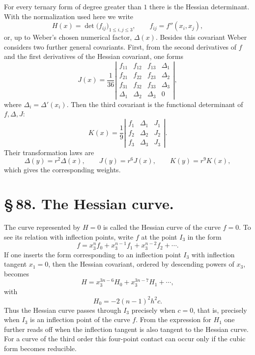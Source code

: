 \documentclass[11pt]{article}
\begin{document}
For every ternary form of degree greater than $1$ there is the Hessian determinant. With the normalization used here we write
\begin{equation}
 H(x)=\det\bigl(f_{ij}\bigr)_{1\le i,j\le3},\qquad f_{ij}=f''(x_i,x_j),
 \tag{2}
\end{equation}
or, up to Weber's chosen numerical factor, $\Delta(x)$. Besides this covariant Weber considers two further general covariants. First, from the second derivatives of $f$ and the first derivatives of the Hessian covariant, one forms
\begin{equation}
 J(x)=\frac1{36}
 \left|\begin{array}{cccc}
 f_{11}&f_{12}&f_{13}&\Delta_1\\
 f_{21}&f_{22}&f_{23}&\Delta_2\\
 f_{31}&f_{32}&f_{33}&\Delta_3\\
 \Delta_1&\Delta_2&\Delta_3&0
 \end{array}\right|,
 \tag{3}
\end{equation}
where $\Delta_i=\Delta'(x_i)$. Then the third covariant is the functional determinant of $f,\Delta,J$:
\begin{equation}
 K(x)=\frac1{9}
 \left|\begin{array}{ccc}
 f_1&\Delta_1&J_1\\
 f_2&\Delta_2&J_2\\
 f_3&\Delta_3&J_3
 \end{array}\right|.
 \tag{4}
\end{equation}
Their transformation laws are
\begin{equation}
 \Delta(y)=r^2\Delta(x),\qquad J(y)=r^6J(x),\qquad K(y)=r^9K(x),
 \tag{5}
\end{equation}
which gives the corresponding weights.

\section*{\S\,88. The Hessian curve.}

The curve represented by $H=0$ is called the Hessian curve of the curve $f=0$. To see its relation with inflection points, write $f$ at the point $I_3$ in the form
\begin{equation}
 f=x_3^n f_0+x_3^{n-1}f_1+x_3^{n-2}f_2+\cdots.
 \tag{1}
\end{equation}
If one inserts the form corresponding to an inflection point $I_3$ with inflection tangent $x_1=0$, then the Hessian covariant, ordered by descending powers of $x_3$, becomes
\begin{equation}
 H=x_3^{3n-6}H_0+x_3^{3n-7}H_1+\cdots,
 \tag{2}
\end{equation}
with
\begin{equation}
 H_0=-2(n-1)^2h^2c.
 \tag{3}
\end{equation}
Thus the Hessian curve passes through $I_3$ precisely when $c=0$, that is, precisely when $I_3$ is an inflection point of the curve $f$. From the expression for $H_1$ one further reads off when the inflection tangent is also tangent to the Hessian curve. For a curve of the third order this four-point contact can occur only if the cubic form becomes reducible.
\end{document}
